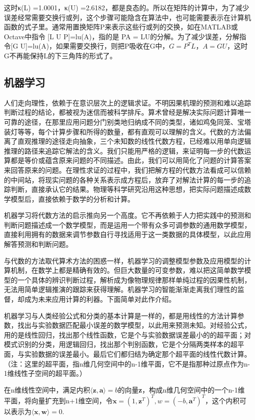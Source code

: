 这时κ(L) =1.0001，κ(U) =2.6182，都是良态的。所以在矩阵的计算中，为了减少误差经常需要交换行或列，这个步骤可能隐含在算法中，也可能需要表示在计算机函数的式子里。通常用置换矩阵P来表示这些行或列的交换，如在MATLAB或Octave中指令 [L U P]=lu(A)，指的是 PA = LU的分解。为了减少误差，分解指令[G U]=lu(A)，如果需要交换行，则把P吸收在G中，$ G=P^{T}L，A=GU $，这时G不再能保持L的下三角阵的形式了。

\subsection{机器学习}

人们走向理性，依赖于在意识层次上的逻辑求证。不明因果机理的预测和难以追踪判断过程的结论，都被视为迷信而被科学排斥。算术曾经是解决实际问题计算唯一可靠的途径，在那里应用问题分门别类地归纳成不同的类型，诸如鸡兔同笼、宝塔装灯等等，每个计算步骤和所得的数量，都有直观可以理解的含义。代数的方法偏离了直观推理的途径走向抽象，三个未知数的线性代数方程，已经难以用单向逻辑推理的路径来追踪它解法的含义。我们只能用严格的逻辑，来证明每一步的代数运算都是等价或蕴含原来问题的不同描述。由此，我们可以用简化了问题的计算答案来回答原来的问题。在理性求证的过程中，我们把解方程的代数方法看成可以信赖的中间站，将现实问题的各种关系表示成方程后，放弃了对解法计算的每一步的追踪判断，直接承认它的结果。物理等科学研究沿用这种思想，把实际问题描述成数学模型后，直接依赖于数学的分析和计算。

机器学习将代数方法的启示推向另一个高度。它不再依赖于人力把实践中的预测和判断问题描述成一个数学模型，而是运用一个带有众多可调参数的通用数学模型，直接利用拥有的数据来调节参数自行寻找适用于这一类数据的具体模型，以此应用解答预测和判断问题。

与代数的方法取代算术方法的困惑一样，机器学习的调整模型参数及应用模型的计算机制，在数学上都是精确有效的。但巨大数量的可变参数，难以把这简单数学模型的一个具体的辨识判断过程，解析成为像物理规律那样单纯过程的因果性机制，无法用简单逻辑推演的跟踪来获得理解。机器学习的智能渐渐走离我们理性的监督，却成为未来应用计算的利器。下面简单对此作介绍。

机器学习与人类经验公式和分类的基本计算是一样的，都是用线性的方法计算参数，找出与实验数据匹配最小误差的数学模型，以此用来预测未知。对经验公式，用的是线性回归，找出那个线性函数，它是个与实验数据误差最小的的超平面；对模式识别的分类，用逻辑回归，找出那个判别函数，它是个分隔两类样本的超平面，与实验数据的误差最小。最后它们都归结为确定那个超平面的线性代数计算。（注：这里的超平面，指n维几何空间中的n-1维平面，它不是指那种过原点作为n-1维线性子空间的超平面。）

在n维线性空间中，满足内积$\langle \bm{z},\bm{a}\rangle = b $的向量\textbf{z}，构成n维几何空间中的一个n-1维平面，将向量扩充到n+1维空间，令$ \bm{x}=(1,\bm{z}^T)^T, w=(-b,\bm{a}^T)^T $，这个内积可以表示为$ \langle \bm{x},\bm{w}\rangle= 0 $.

